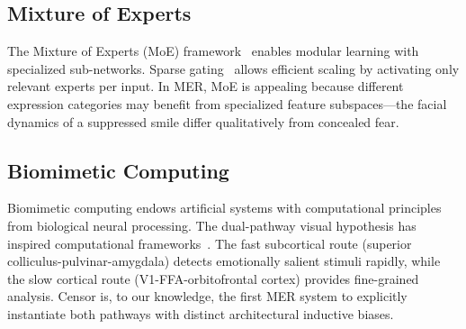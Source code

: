\subsection{Mixture of Experts}

The Mixture of Experts (MoE) framework~\cite{jacobs1991moe} enables modular learning with specialized sub-networks. Sparse gating~\cite{fedus2022switch} allows efficient scaling by activating only relevant experts per input. In MER, MoE is appealing because different expression categories may benefit from specialized feature subspaces—the facial dynamics of a suppressed smile differ qualitatively from concealed fear.

\subsection{Biomimetic Computing}

Biomimetic computing endows artificial systems with computational principles from biological neural processing. The dual-pathway visual hypothesis has inspired computational frameworks~\cite{morris1999amygdala}. The fast subcortical route (superior colliculus-pulvinar-amygdala) detects emotionally salient stimuli rapidly, while the slow cortical route (V1-FFA-orbitofrontal cortex) provides fine-grained analysis. Censor is, to our knowledge, the first MER system to explicitly instantiate both pathways with distinct architectural inductive biases.